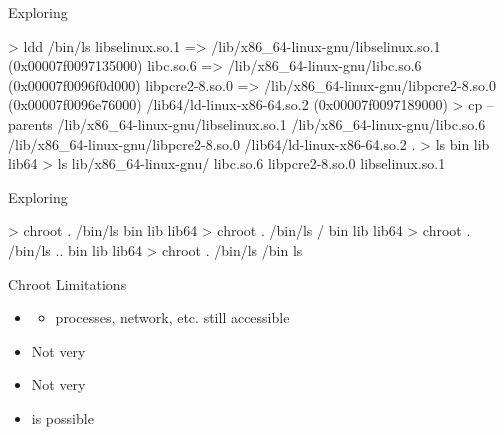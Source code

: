 \documentclass{slide}
\begin{document}
\begin{frame}[fragile]{Exploring }
    \vspace{-0.5em}
    \begin{code}[numbers=none]{}
> ldd /bin/ls
    libselinux.so.1 => /lib/x86_64-linux-gnu/libselinux.so.1 (0x00007f0097135000)
    libc.so.6 => /lib/x86_64-linux-gnu/libc.so.6 (0x00007f0096f0d000)
    libpcre2-8.so.0 => /lib/x86_64-linux-gnu/libpcre2-8.so.0 (0x00007f0096e76000)
    /lib64/ld-linux-x86-64.so.2 (0x00007f0097189000)
> cp --parents /lib/x86_64-linux-gnu/libselinux.so.1 /lib/x86_64-linux-gnu/libc.so.6 /lib/x86_64-linux-gnu/libpcre2-8.so.0 /lib64/ld-linux-x86-64.so.2 .
> ls
bin  lib  lib64
> ls lib/x86_64-linux-gnu/
libc.so.6  libpcre2-8.so.0  libselinux.so.1
    \end{code}
\end{frame}


\begin{frame}[fragile]{Exploring }
    \begin{code}[numbers=none]{}
> chroot . /bin/ls
bin  lib  lib64
> chroot . /bin/ls /
bin  lib  lib64
> chroot . /bin/ls ..
bin  lib  lib64
> chroot . /bin/ls /bin
ls
    \end{code}
\end{frame}


\begin{frame}[fragile]{Chroot Limitations}
    {\LARGE
    \begin{itemize}
        \item {}
        \begin{itemize}
            \Large \item processes, network, etc. still accessible
        \end{itemize}
        \item Not very 
        \item Not very 
        \item {} is possible
    \end{itemize}
    }
\end{frame}
\end{document}
